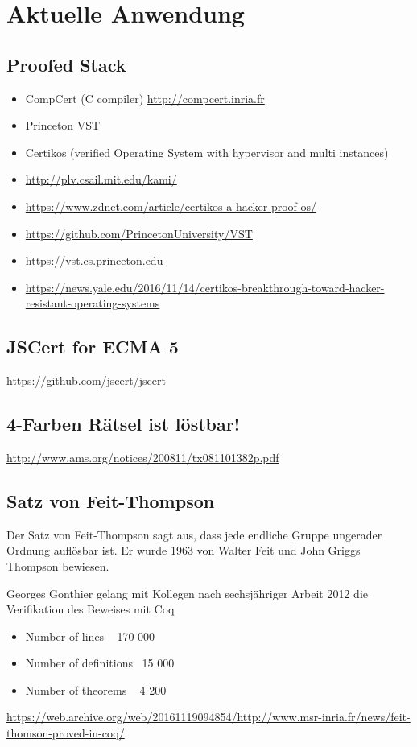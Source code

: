 \section{Aktuelle Anwendung}
\subsection{Proofed Stack}
\begin{itemize}
	\item CompCert (C compiler) \url{http://compcert.inria.fr}
	\item Princeton VST
	\item Certikos (verified Operating System with hypervisor and multi instances)
	\item \url{http://plv.csail.mit.edu/kami/}
	\item \url{https://www.zdnet.com/article/certikos-a-hacker-proof-os/}
	\item \url{https://github.com/PrincetonUniversity/VST}
	\item \url{https://vst.cs.princeton.edu}
	\item \url{https://news.yale.edu/2016/11/14/certikos-breakthrough-toward-hacker-resistant-operating-systems}
\end{itemize}
\subsection{JSCert for ECMA 5}
\url{https://github.com/jscert/jscert}
\subsection{4-Farben Rätsel ist löstbar!}
\url{http://www.ams.org/notices/200811/tx081101382p.pdf}
\subsection{Satz von Feit-Thompson}
Der Satz von Feit-Thompson sagt aus, dass jede endliche Gruppe ungerader Ordnung auflösbar ist. Er wurde 1963 von Walter Feit und John Griggs Thompson bewiesen.

Georges Gonthier gelang mit Kollegen nach sechsjähriger Arbeit 2012 die Verifikation des Beweises mit Coq
\begin{itemize}
	\item Number of lines ~ 170 000
	\item Number of definitions ~15 000
	\item Number of theorems ~ 4 200
\end{itemize}
\url{https://web.archive.org/web/20161119094854/http://www.msr-inria.fr/news/feit-thomson-proved-in-coq/}
